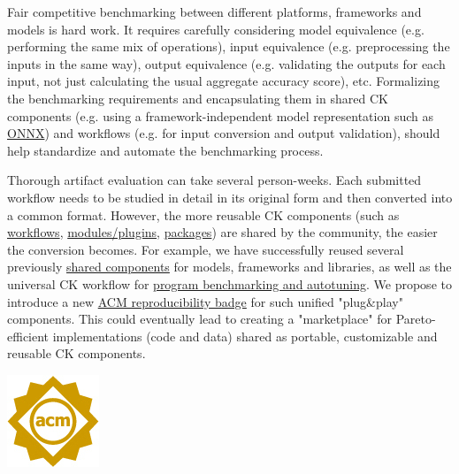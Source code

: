 \documentclass[10pt,onecolumn]{article}
\newenvironment{packed_itemize}{
\begin{itemize}
  \setlength{\itemsep}{1pt}
  \setlength{\parskip}{0pt}
  \setlength{\parsep}{0pt}
}{\end{itemize}}
\begin{document}
\begin{packed_itemize}

 \item

Fair competitive benchmarking between different platforms,
frameworks and models is hard work. It requires carefully
considering model equivalence (e.g. performing the same mix of
operations), input equivalence (e.g. preprocessing the inputs
in the same way), output equivalence (e.g. validating the
outputs for each input, not just calculating the usual
aggregate accuracy score), etc. Formalizing the benchmarking
requirements and encapsulating them in shared CK components
(e.g. using a framework-independent model representation such
as \href{https://onnx.ai/}{ONNX}) and workflows (e.g. for input conversion and output
validation), should help standardize and automate the
benchmarking process.

 \item

Thorough artifact evaluation can take several person-weeks.
Each submitted workflow needs to be studied in detail in its
original form and then converted into a common format.
However, the more reusable CK components (such as 
\href{http://cKnowledge.org/shared-programs.html}{workflows},
\href{http://cKnowledge.org/shared-modules.html}{modules/plugins}, 
\href{http://cKnowledge.org/shared-packages.html}{packages}) 
are shared by the community, the easier the conversion becomes. 
For example, we have
successfully reused several previously 
\href{https://github.com/ctuning/ck/wiki#user-content-reusable-ck-components}{shared components} 
for models, frameworks and libraries, as well as the universal
CK workflow for \href{http://cKnowledge.org/rpi-crowd-tuning}{program benchmarking and autotuning}.
We propose to introduce a new 
\href{https://www.acm.org/publications/policies/artifact-review-badging}{ACM reproducibility badge} 
for such unified "plug\&play" components. This could eventually
lead to creating a "marketplace" for Pareto-efficient
implementations (code and data) shared as portable,
customizable and reusable CK components.

\begin{center}\includegraphics{ck-assets/artifacts_automated_dl.jpg}\end{center}


\end{packed_itemize}
\end{document}
